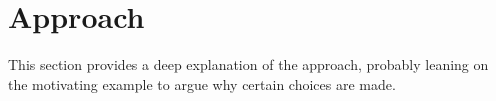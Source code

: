 \section{Approach}
\label{sec:approach}

This section provides a deep explanation of the approach, probably leaning on the motivating
example to argue why certain choices are made.
